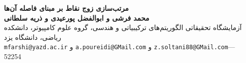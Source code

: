 \documentclass[a0,portrait]{a0poster}
\theoremstyle{definition}
\theoremstyle{plain}
\theoremstyle{definition}
\begin{document}
 \BgThispage
\begin{center}
\VERYHuge \textbf{مرتب‌سازی زوج نقاط بر مبنای فاصله آن‌ها}\\  %
\huge \textbf{محمد فرشی و ابوالفضل پورعیدی و ذریه سلطانی}\\[0.5cm] %
\large آزمایشگاه تحقیقاتی الگوریتم‌های ترکیبیاتی و هندسی، گروه علوم کامپیوتر، دانشکده ریاضی، دانشگاه یزد\\[0.4cm] %
\large \texttt{mfarshi@yazd.ac.ir} و  \texttt{a.poureidi@GMail.com}  و \texttt{z.soltani88@GMail.com}--- 52254%
\end{center}

\vspace{1cm} %

\end{document}
